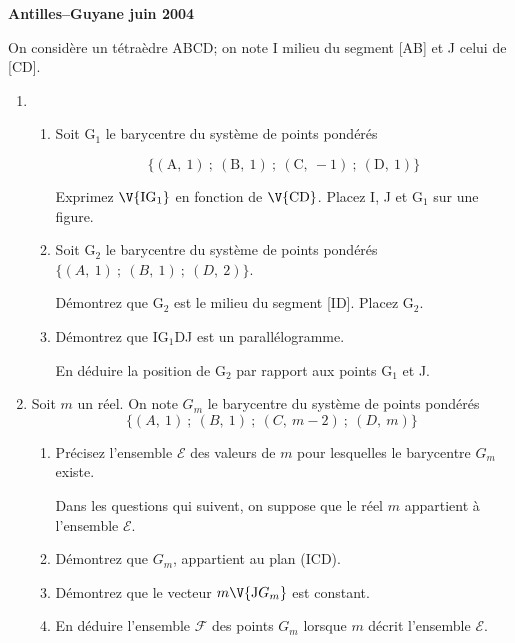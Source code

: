 \documentclass[a4paper]{article}
\begin{document}
\lfoot{}
\cfoot{}


\textbf{\large Antilles--Guyane juin 2004}

\vspace{0,25cm}

On consid\`ere un t\'etra\`edre ABCD; on note I milieu du segment [AB] et J celui
 de [CD].

\begin{enumerate} \item

\begin{enumerate} \item Soit G$_{1}$ le barycentre du syst\`eme de points pond\'er\'es 

 \[\{(\text{A},~ 1)~;~ (\text{B},~ 1)~;~ (\text{C},~-1)~;~ (\text{D},~1)\}\]

Exprimez $\V{\text{IG}_{1}}$ en fonction de $\V{\text{CD}}$. Placez I, J et G$_{1}$ sur une figure. 

\item Soit G$_{2}$ le barycentre du syst\`eme de points pond\'er\'es 
$\{(A,~ 1)~;~ (B,~ 1)~ ;~ (D,~ 2)\}$.

D\'emontrez que G$_{2}$ est le milieu du segment [ID]. Placez G$_{2}$.

\item D\'emontrez que IG$_{1}$DJ est un parall\'elogramme.

En d\'eduire la position de G$_{2}$ par rapport aux points G$_{1}$ et J.

\end{enumerate}

\item Soit $m$ un r\'eel. On note $G_{m}$ le barycentre du syst\`eme de points pond\'er\'es
\[\{(A,~ 1)~;~(B,~ 1)~;~(C,~m-2)~;~(D,~m)\}\]

\begin{enumerate} \item Pr\'ecisez l'ensemble $\mathcal{E}$ des valeurs de $m$ pour lesquelles le barycentre 
$G_{m}$ existe.

Dans les questions qui suivent, on suppose que le r\'eel $m$ appartient \`a l'ensemble
$\mathcal{E}$.

\item D\'emontrez que $G_{m}$, appartient au plan (ICD).

\item D\'emontrez que le vecteur $m\V{\text{J}G_{m}}$ est constant.

\item En d\'eduire l'ensemble $\mathcal{F}$ des points $G_{m}$ lorsque $m$ d\'ecrit
l'ensemble $\mathcal{E}$.

\end{enumerate}
 
\end{enumerate}
\end{document}
